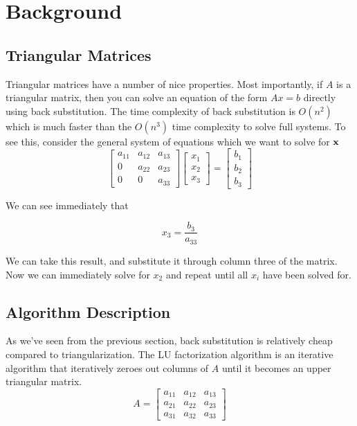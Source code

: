 \documentclass[12]{article}
\begin{document}
\section{Background}

\subsection{Triangular Matrices}

Triangular matrices have a number of nice properties.  Most importantly, if $A$ is a triangular matrix, then you can solve an equation of the form $Ax = b$ directly using back substitution.  The time complexity of back substitution is $O(n^2)$ which is much faster than the $O(n^3)$ time complexity to solve full systems.  To see this, consider the general system of equations which we want to solve for ${\bf x}$
$$
\begin{bmatrix}
	a_{11} &  a_{12} &  a_{13}  \\
	0  &  a_{22} &  a_{23}  \\
	0  &  0  &  a_{33}
\end{bmatrix}
\begin{bmatrix}
x_1\\x_2\\x_3
\end{bmatrix}
=
\begin{bmatrix}
b_1\\b_2\\b_3
\end{bmatrix}
$$

We can see immediately that 

$$x_{3} = \frac{b_3}{a_{33}}$$

We can take this result, and substitute it through column three of the matrix.  Now we can immediately solve for $x_2$ and repeat until all $x_i$ have been solved for.

\subsection{Algorithm Description}

As we've seen from the previous section, back substitution is relatively cheap compared to triangularization.  The LU factorization algorithm is an iterative algorithm that iteratively zeroes out columns of $A$ until it becomes an upper triangular matrix.  
$$
A = 
\begin{bmatrix}
	a_{11} &  a_{12} &  a_{13}  \\
	a_{21}  &  a_{22} &  a_{23}  \\
	a_{31}  &  a_{32}  &  a_{33}
\end{bmatrix}
$$
\end{document}
